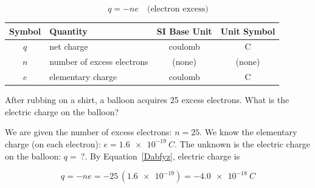 \documentclass[main.tex]{subfiles}
\begin{document}
\begin{equation} \label{Dabfyz}
    q = - ne \hspace{1em} \text{(electron excess)}
\end{equation}

\begin{center}
    \begin{tabular}{cl|cc}
    \hline
    \textbf{Symbol} & \textbf{Quantity} & \textbf{SI Base Unit} & \textbf{Unit Symbol}  \\
    \hline\hline
    \rule{0pt}{2.5ex}
        $q$ & net charge & coulomb & \si{\coulomb}\\
        $n$ & number of excess electrons & (none) & (none) \\
        $e$ & elementary charge & coulomb & \si{\coulomb} \\
    \hline
    \end{tabular}
\end{center}

\begin{example}
    After rubbing on a shirt, a balloon acquires 25 excess electrons. What is the electric charge on the balloon?
\end{example}

\Solution We are given the number of excess electrons: $n = 25$. We know the elementary charge (on each electron): $e = \SI{1.6e-19}{C}$. The unknown is the electric charge on the balloon: $q =\ ?$. By Equation~\ref{Dabfyz}, electric charge is

\begin{equation*}
    q = - n e = -25\,(\num{1.6e-19}) = \SI{-4.0e-18}{C}
\end{equation*}

\cyanhrule
\end{document}
